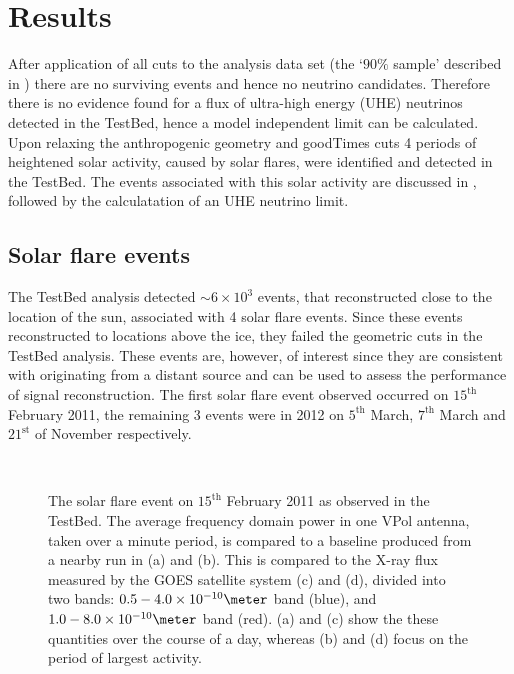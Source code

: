 \chapter{Results}
\label{chap:Results}

After application of all cuts to the analysis data set (the `$90 \%$ sample' described in ) there are no surviving events and hence no neutrino candidates. Therefore there is no evidence found for a flux of ultra-high energy (UHE) neutrinos detected in the TestBed, hence a model independent limit can be calculated. Upon relaxing the anthropogenic geometry and goodTimes cuts 4 periods of heightened solar activity, caused by solar flares, were identified and detected in the TestBed. The events associated with this solar activity are discussed in , followed by the calculatation of an UHE neutrino limit.


\section{Solar flare events}
\label{sec:Results:Solar-Flare}

The TestBed analysis detected $\sim 6 \times 10^{3}$ events, that reconstructed close to the location of the sun, associated with 4 solar flare events. Since these events reconstructed to locations above the ice, they failed the geometric cuts in the TestBed analysis. These events are, however, of interest since they are consistent with originating from a distant source and can be used to assess the performance of signal reconstruction. The first solar flare event observed occurred on $15^{\mbox{th}}$ February 2011, the remaining 3 events were in 2012 on $5^{\mbox{th}}$ March, $7^{\mbox{th}}$ March and $21^{\mbox{st}}$ of November respectively.



\begin{figure} [htpb]
  \hfill
  \\
  \hfill
  \caption{The solar flare event on $15^{\mbox{th}}$ February 2011 as observed in the TestBed. The average frequency domain power in one VPol antenna, taken over a minute period, is compared to a baseline produced from a nearby run in (a) and (b). This is compared to the X-ray flux measured by the GOES satellite system \cite{2009SPIE.7438E...1C} (c) and (d), divided into two bands: $0.5 - 4.0 \times 10^{-10} \meter$ band (blue), and $1.0 - 8.0 \times 10^{-10} \meter$ band (red). (a) and (c) show the these quantities over the course of a day, whereas (b) and (d) focus on the period of largest activity.}  
  \label{fig:Results:Solar-Flare:Frequency}
\end{figure}

